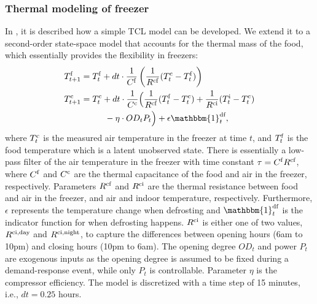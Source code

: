 \subsubsection{Thermal modeling of freezer}

In \cite{hao2014aggregate}, it is described how a simple TCL model can be developed. We extend it to a second-order state-space model that accounts for the thermal mass of the food, which essentially provides the flexibility in freezers:
%
\begin{subequations}\label{eq:2ndFreezerStateSpace}
    \begin{align}
        T^{\rm{f}}_{t+1} & = T^{\rm{f}}_{t} + dt \cdot \frac{1}{C^{\rm{f}}}\left(\frac{1}{R^{\rm{cf}}} (T^{\rm{c}}_{t} - T^{\rm{f}}_{t}) \right)                                                                              \\
        T^{\rm{c}}_{t+1} & = T^{\rm{c}}_t + dt \cdot \frac{1}{C^{\rm{c}}}\Bigl(\frac{1}{R^{\rm{cf}}} (T^{\rm{f}}_t - T^{\rm{c}}_t) + \frac{1}{R^{\rm{ci}}} (T^{\rm{i}}_t - T^{\rm{c}}_t)                                          \notag \\ & \mspace{50mu} - \eta \cdot OD_t P_t \Bigr) + \epsilon \mathbbm{1}^{\text{df}}_{t},
    \end{align}
\end{subequations}
%
where $T^{\rm{c}}_t$ is the measured air temperature in the freezer at time $t$, and $T^{\rm{f}}_t$ is the food temperature which is a latent unobserved state. There is essentially a low-pass filter of the air temperature in the freezer with time constant $\tau = C^{\rm{f}} R^{\rm{cf}}$, where $C^{\rm{f}}$ and $C^{\rm{c}}$ are the thermal capacitance of the food and air in the freezer, respectively. Parameters $R^{\rm{cf}}$ and $R^{\rm{ci}}$ are the thermal resistance between food and air in the freezer, and air and indoor temperature, respectively. Furthermore, $\epsilon$ represents the temperature change when defrosting and $\mathbbm{1}^{\text{df}}_{t}$ is the indicator function for when defrosting happens. $R^{\rm{ci}}$ is either one of two values, $R^{\rm{ci}, \text{day}}$ and $R^{\rm{ci}, \text{night}}$, to capture the differences between opening hours (6am to 10pm) and closing hours (10pm to 6am). The opening degree $OD_t$ and power $P_t$ are exogenous inputs as the opening degree is assumed to be fixed during a demand-response event, while only $P_t$ is controllable. Parameter $\eta$ is the compressor efficiency. The model is discretized with a time step of 15 minutes, i.e., $dt = 0.25$ hours. 


